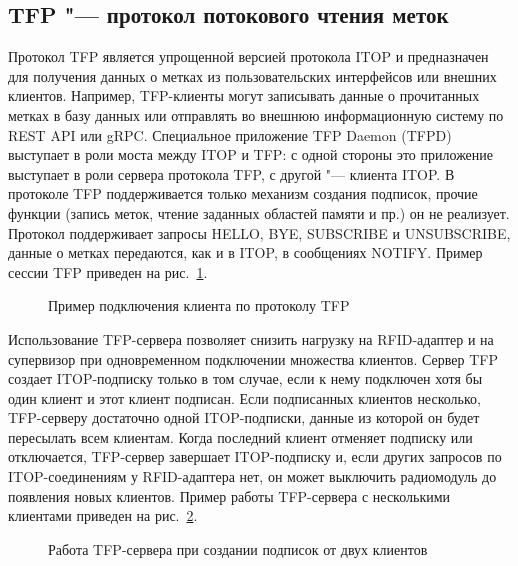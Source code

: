 \subsection{TFP "--- протокол потокового чтения меток}\label{sec:ch5_tfp}

Протокол TFP является упрощенной версией протокола ITOP и предназначен для получения данных о метках из пользовательских интерфейсов или внешних клиентов. Например, TFP-клиенты могут записывать данные о прочитанных метках в базу данных или отправлять во внешнюю информационную систему по REST API или gRPC. Специальное приложение TFP Daemon (TFPD) выступает в роли моста между ITOP и TFP: с одной стороны это приложение выступает в роли сервера протокола TFP, с другой "--- клиента ITOP. В протоколе TFP поддерживается только механизм создания подписок, прочие функции (запись меток, чтение заданных областей памяти и пр.) он не реализует. Протокол поддерживает запросы HELLO, BYE, SUBSCRIBE и UNSUBSCRIBE, данные о метках передаются, как и в ITOP, в сообщениях NOTIFY. Пример сессии TFP приведен на рис.~\ref{fig:ch5_tfp_session_1}.

\begin{figure}[ht]
  \caption{Пример подключения клиента по протоколу TFP}
  \label{fig:ch5_tfp_session_1}
\end{figure}

Использование TFP-сервера позволяет снизить нагрузку на RFID-адаптер и на супервизор при одновременном подключении множества клиентов. Сервер TFP создает ITOP-подписку только в том случае, если к нему подключен хотя бы один клиент и этот клиент подписан. Если подписанных клиентов несколько, TFP-серверу достаточно одной ITOP-подписки, данные из которой он будет пересылать всем клиентам. Когда последний клиент отменяет подписку или отключается, TFP-сервер завершает ITOP-подписку и, если других запросов по ITOP-соединениям у RFID-адаптера нет, он может выключить радиомодуль до появления новых клиентов. Пример работы TFP-сервера с несколькими клиентами приведен на рис.~\ref{fig:ch5_tfp_session_2}.

\begin{figure}[ht]
  \caption{Работа TFP-сервера при создании подписок от двух клиентов}
  \label{fig:ch5_tfp_session_2}
\end{figure}



